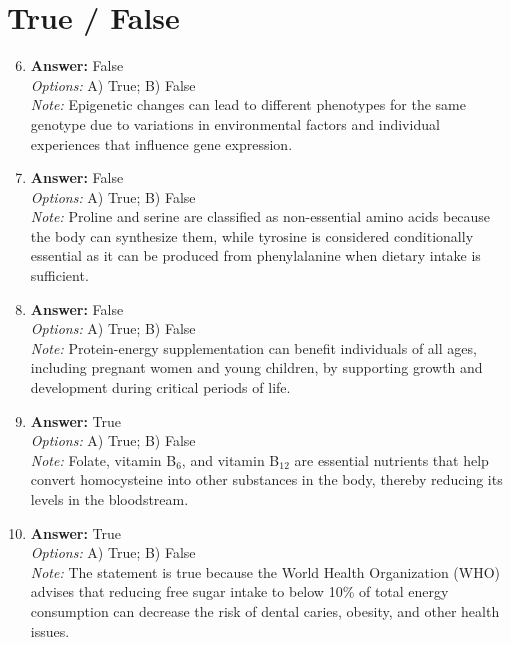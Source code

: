 \documentclass[12pt]{article}
\begin{document}
\section*{True / False}
\begin{enumerate}[label=\arabic*.]
\setcounter{enumi}{5}
\item \textbf{Answer:} False
\\ \textit{Options:} A) True; B) False
\\ \textit{Note:} Epigenetic changes can lead to different phenotypes for the same genotype due to variations in environmental factors and individual experiences that influence gene expression.
\item \textbf{Answer:} False
\\ \textit{Options:} A) True; B) False
\\ \textit{Note:} Proline and serine are classified as non-essential amino acids because the body can synthesize them, while tyrosine is considered conditionally essential as it can be produced from phenylalanine when dietary intake is sufficient.
\item \textbf{Answer:} False
\\ \textit{Options:} A) True; B) False
\\ \textit{Note:} Protein-energy supplementation can benefit individuals of all ages, including pregnant women and young children, by supporting growth and development during critical periods of life.
\item \textbf{Answer:} True
\\ \textit{Options:} A) True; B) False
\\ \textit{Note:} Folate, vitamin B$_{6}$, and vitamin B$_{12}$ are essential nutrients that help convert homocysteine into other substances in the body, thereby reducing its levels in the bloodstream.
\item \textbf{Answer:} True
\\ \textit{Options:} A) True; B) False
\\ \textit{Note:} The statement is true because the World Health Organization (WHO) advises that reducing free sugar intake to below 10\% of total energy consumption can decrease the risk of dental caries, obesity, and other health issues.
\end{enumerate}
\end{document}
